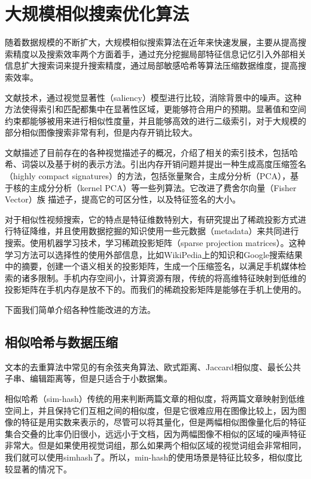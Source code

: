 \section{大规模相似搜索优化算法}

随着数据规模的不断扩大，大规模相似搜索算法在近年来快速发展，主要从提高搜索精度以及搜索效率两个方面着手，通过充分挖掘局部特征信息记忆引入外部相关信息扩大搜索词来提升搜索精度，通过局部敏感哈希等算法压缩数据维度，提高搜索效率\cite{POLICY:2013te}。

文献\cite{Li:2013ks}技术，通过视觉显著性（saliency）模型进行比较，消除背景中的噪声。这种方法使得索引和匹配都集中在显著性区域，更能够符合用户的预期。显著值和空间约束都能够被用来进行相似性度量，并且能够高效的进行二级索引，对于大规模的部分相似图像搜索非常有利，但是内存开销比较大。

文献\cite{Negrel:2013ur}描述了目前存在的各种视觉描述子的概况，介绍了相关的索引技术，包括哈希、词袋以及基于树的表示方法。引出内存开销问题并提出一种生成高度压缩签名（highly compact signatures）的方法，包括张量聚合，主成分分析（PCA），基于核的主成分分析（kernel PCA）等一些列算法。它改进了费舍尔向量（Fisher Vector）族 描述子，提高它的可区分性，以及特征签名的大小。

对于相似性视频搜索，它的特点是特征维数特别大，有研究提出了稀疏投影方式进行特征降维，并且使用数据挖掘的知识使用一些元数据（metadata）来共同进行搜索\cite{Wu:2013tb}。使用机器学习技术，学习稀疏投影矩阵（sparse projection matrices）。这种学习方法可以选择性的使用外部信息，比如WikiPedia上的知识和Google搜索结果中的摘要，创建一个语义相关的投影矩阵，生成一个压缩签名，以满足手机媒体检索的诸多限制。手机内存空间小，计算资源有限，传统的将高维特征映射到低维的投影矩阵在手机内存是放不下的。而我们的稀疏投影矩阵是能够在手机上使用的。

下面我们简单介绍各种性能改进的方法。

\subsection{相似哈希与数据压缩}
文本的去重算法中常见的有余弦夹角算法、欧式距离、Jaccard相似度、最长公共子串、编辑距离等，但是只适合于小数据集。

相似哈希（sim-hash）传统的用来判断两篇文章的相似度，将两篇文章映射到低维空间上，并且保持它们互相之间的相似度，但是它很难应用在图像比较上，因为图像的特征是用实数来表示的，尽管可以将其量化，但是两幅相似图像量化后的特征集合交叠的比率仍旧很小，远远小于文档，因为两幅图像不相似的区域的噪声特征非常大。但是如果使用视觉词组，那么如果两个相似区域的视觉词组会非常相同，我们就可以使用simhash了。所以，min-hash的使用场景是特征比较多，相似度比较显著的情况下。

